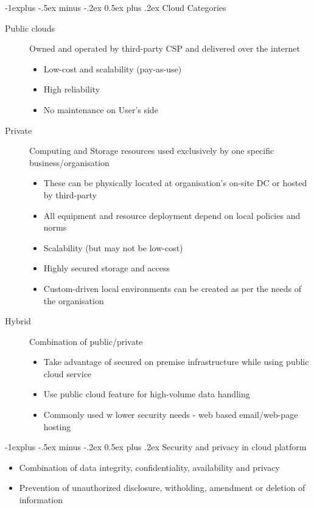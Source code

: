 \documentclass{article}
\makeatletter
\renewcommand{\subsection}{\@startsection{subsection}{2}{0mm}%
    {-1explus -.5ex minus -.2ex}%
    {0.5ex plus .2ex}%
{\normalfont\normalsize\bfseries}}
\makeatother
\begin{document}
\begin{multicols*}{3}
\subsection{Cloud Categories}
\begin{description}
	\item[Public clouds]{Owned and operated by third-party CSP and delivered over the internet}
	\begin{itemize}
		\item Low-cost and scalability (pay-as-use)
		\item High reliability
		\item No maintenance on User's side
	\end{itemize}
	\item[Private]{Computing and Storage resources used exclusively by one specific business/organisation}
	\begin{itemize}
		\item These can be physically located at organisation's on-site DC or hosted by third-party
		\item All equipment and resource deployment depend on local policies and norms
		\item Scalability (but may not be low-cost)
		\item Highly secured storage and access
		\item Custom-driven local environments can be created as per the needs of the organisation
	\end{itemize}
	\item[Hybrid]{Combination of public/private}
	\begin{itemize}
		\item Take advantage of secured on premise infrastructure while using public cloud service
		\item Use public cloud feature for high-volume data handling
		\item Commonly used w lower security needs - web based email/web-page hosting
	\end{itemize}
\end{description}
\subsection{Security and privacy in cloud platform}
\begin{itemize}
	\item Combination of data integrity, confidentiality, availability and privacy
	\item Prevention of unauthorized disclosure, witholding, amendment or deletion of information
\end{itemize}

\end{multicols*}
\end{document}
